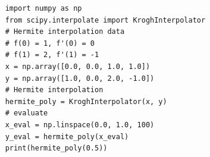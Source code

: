 \begin{verbatim}
	import numpy as np
	from scipy.interpolate import KroghInterpolator
	# Hermite interpolation data
	# f(0) = 1, f'(0) = 0
	# f(1) = 2, f'(1) = -1
	x = np.array([0.0, 0.0, 1.0, 1.0])
	y = np.array([1.0, 0.0, 2.0, -1.0])
	# Hermite interpolation
	hermite_poly = KroghInterpolator(x, y)
	# evaluate
	x_eval = np.linspace(0.0, 1.0, 100)
	y_eval = hermite_poly(x_eval)
	print(hermite_poly(0.5))
\end{verbatim}
